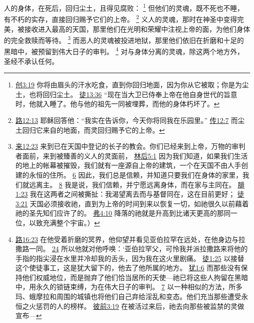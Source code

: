 \documentclass[12pt, a4paper, oneside]{ctexart}
\newcounter{parnum}[section]
\newcommand{\N}{%
   \noindent\refstepcounter{parnum}%
    \makebox[\parindent][l]{\textbf{\arabic{parnum}.}}}
\begin{document}
\N 人的身体，在死后，回归尘土，且得见腐败：
	\footnote {
		\href{https://biblehub.com/genesis/3-19.htm}{创3:19} 你将由眉头的汗水吃食，直到你回归地面，因为你从它被取；你是为尘土，也将回归尘土。
		\href{https://biblehub.com/acts/13-36.htm}{徒13:36} “现在当大卫已侍奉上帝在他自身世代的旨意时，他就入睡了。他与他的祖先一同被埋葬，而他的身体朽坏了。
	}
	但他们的灵魂，既不死也不睡，有不朽的实存，直接回归赐予它们的上帝。
	\footnote {
		\href{https://biblehub.com/luke/23-43.htm}{路12:13} 耶稣回答他：“我实在告诉你，今天你将同我在乐园里。”
		\href{https://biblehub.com/ecclesiastes/12-7.htm}{传12:7} 而尘土回归它来自的地面，而灵回归赐予它的上帝。
	}
	义人的灵魂，那时在神圣中变得完美，被接收进入最高的天国，那里他们在光明和荣耀中注视上帝的面，为他们身体的完全救赎而等待。
	\footnote {
		\href{https://biblehub.com/hebrews/12-23.htm}{来12:23} 来到已在天国中登记的长子的教会。你们已经来到上帝，万物的审判者面前，来到被臻善的义人的灵面前，
		\href{https://biblehub.com/2_corinthians/5-1.htm}{林后5:1} 因为我们知道，如果我们生活的地上的帐幕被摧毁，我们就有一座源自上帝的建筑，一个在天国不由人手创建的永恒的住所。
		\href{https://biblehub.com/2_corinthians/5-6.htm}{6} 因此，我们总是信赖，并知道只要我们在身体的家里，我们就远离主。
		\href{https://biblehub.com/2_corinthians/5-8.htm}{8} 我是说，我们信赖，并宁愿远离身体，而在家与主同在。
		\href{https://biblehub.com/philippians/1-23.htm}{腓1:23} 我在这两者之间被撕扯：我渴望离去而与基督同在，这在目前更好；
		\href{https://biblehub.com/acts/3-21.htm}{徒3:21} 天国必须接收祂，直到为上帝的时间到来以恢复一切，如祂很久以前藉着祂的圣先知们应许了的。
		\href{https://biblehub.com/ephesians/4-10.htm}{弗4:10} 降落的祂就是升高到比诸天更高的那同一位，以致充满整个宇宙。）
	}
	而恶人的灵魂被投进地狱，那里他们依旧在折磨和十足的黑暗中，被预留到伟大日子的审判。
	\footnote {
		\href{https://biblehub.com/luke/16-23.htm}{路16:23} 在他受着折磨的冥界，他仰望并看见亚伯拉罕在远处，在他身边与拉撒路一同。
		\href{https://biblehub.com/luke/16-24.htm}{24} 所以他就对他呼唤：‘亚伯拉罕父，可怜我并派拉撒路来将他的手指的指尖浸在水里并冷却我的舌头，因为我在这火里剧痛。
		\href{https://biblehub.com/acts/1-25.htm}{徒1:25} 以接替这个使徒事工，这是犹大留下的，他去了他所属的地方。
		\href{https://biblehub.com/jude/1-6.htm}{犹1:6} 而那些没有保持他们权威地位，而是抛弃了他们恰当居所的天使---祂已将这些人拘留在黑暗中，用永久的锁链束缚，为在伟大日子的审判。
		\href{https://biblehub.com/jude/1-7.htm}{7} 以一种相似的方法，所多玛、蛾摩拉和周围的城镇也将他们自己弃给淫乱和变态。他们充当那些遭受永恒之火惩罚的人的榜样。
		\href{https://biblehub.com/1_peter/3-19.htm}{彼前3:19} 在被活过来后，祂去向那些被监禁的灵做宣布---
	}
	对与身体分离的灵魂，除这两个地方外，圣经不承认任何。
	
\end{document}
